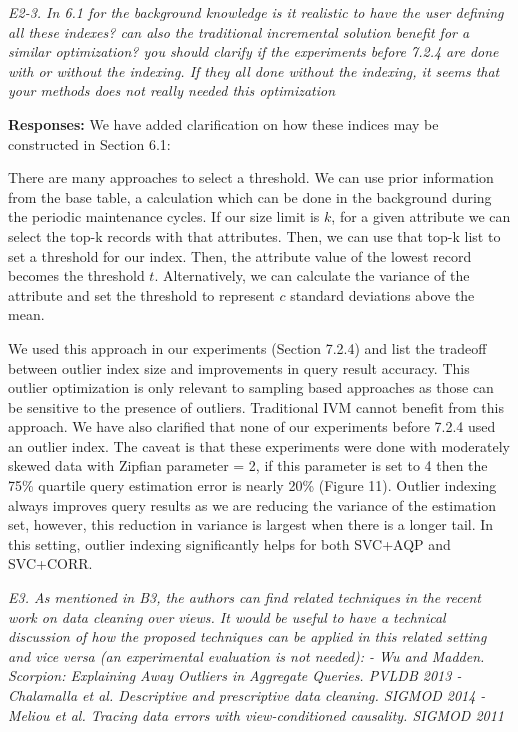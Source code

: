 \vspace{1em}
\emph{E2-3. In 6.1 for the background knowledge is it realistic to have the user defining all these indexes? can also the traditional incremental solution benefit for a similar optimization? you should clarify if the experiments before 7.2.4 are done with or without the indexing. If they all done without the indexing, it seems that your methods does not really needed this optimization}

\vspace{.25em}

{\bf Responses:} We have added clarification on how these indices may be constructed in Section 6.1:
\begin{displayquote}There are many approaches to select a threshold. We can use prior information from the base table, a calculation which can be done in the background during the periodic maintenance cycles. If our size limit is $k$, for a given attribute we can select the top-k records with that attributes. Then, we can use that top-k list to set a threshold for our index.  Then, the attribute value of the lowest record becomes the threshold $t$. Alternatively, we can calculate the variance of the attribute and set the threshold to represent $c$ standard deviations above the mean.\end{displayquote}
We used this approach in our experiments (Section 7.2.4) and list the tradeoff between outlier index size and improvements in query result accuracy.
This outlier optimization is only relevant to sampling based approaches as those can be sensitive to the presence of outliers. Traditional IVM cannot benefit from this approach. 
We have also clarified that none of our experiments before 7.2.4 used an outlier index. The caveat is that these experiments were done with moderately skewed data with Zipfian parameter = 2, if this parameter is set to 4 then the 75\% quartile query estimation error is nearly 20\% (Figure 11). 
Outlier indexing always improves query results as we are reducing the variance of the estimation set, however, this reduction in variance is largest when there is a longer tail.
In this setting, outlier indexing significantly helps for both SVC+AQP and SVC+CORR. 

\vspace{1em}
\emph{E3. As mentioned in B3, the authors can find related techniques in the recent work on data cleaning over views. It would be useful to have a technical discussion of how the proposed techniques can be applied in this related setting and vice versa (an experimental evaluation is not needed):
- Wu and Madden. Scorpion: Explaining Away Outliers in Aggregate Queries. PVLDB 2013
- Chalamalla et al. Descriptive and prescriptive data cleaning. SIGMOD 2014
- Meliou et al. Tracing data errors with view-conditioned causality. SIGMOD 2011}

